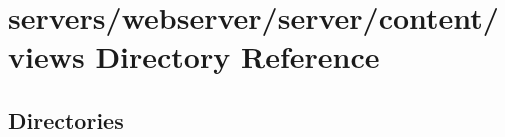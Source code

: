 \section{servers/webserver/server/content/views Directory Reference}
\label{dir_50c88b95934c3be0c38149366d2017ca}
\subsection*{Directories}
\begin{DoxyCompactItemize}
\end{DoxyCompactItemize}
